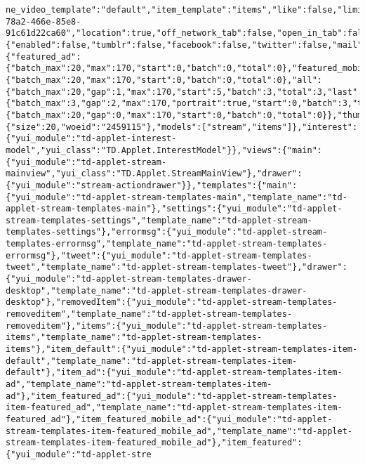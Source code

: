 \begin{verbatim}
ne_video_template":"default","item_template":"items","like":false,"limit_height":true,"link_to_finance":false,"listId_mixin_enabled":false,"listId_mixin_start":9,"listId_mixin_interval":10,"listId_mixin_count":17,"listId_mixin_freshness_window":48,"listId_mixin_id":"a8b3e8e1-78a2-466e-85e8-91c61d22ca60","location":true,"off_network_tab":false,"open_in_tab":false,"pcsExclusions":false,"previewUrl_enabled":false,"pubtime_format":"ONE_UNIT_ABBREVIATED","pubtime_maxage":3600,"search_tags":false,"sfl":true,"sfl_get_started_string":"SFL_LINK","sfl_get_started_title":"SFL_TITLE_ONE","scrollbuffer":900,"show_lastvist":true,"social_sharing":{"enabled":false,"tumblr":false,"facebook":false,"twitter":false,"mail":false},"stream_actions":true,"summary":true,"templates":{"featured_ad":{"batch_max":20,"max":170,"start":0,"batch":0,"total":0},"featured_mobile_ad":{"batch_max":20,"max":170,"start":0,"batch":0,"total":0},"all":{"batch_max":20,"gap":1,"max":170,"start":5,"batch":3,"total":3,"last":13},"featured":{"batch_max":3,"gap":2,"max":170,"portrait":true,"start":0,"batch":3,"total":3,"last":13},"inline_video":{"batch_max":20,"gap":0,"max":170,"start":0,"batch":0,"total":0}},"thumbnail":true,"thumbnail_align":"left","thumbnail_hover":true,"thumbnail_fix_width":false,"thumbnail_size":82,"tweet_action":true,"video_autoplay":false,"viewer":false,"viewer_include_all":false,"viewer_off_network":true,"viewer_prefetch_lcp":false,"viewer_preview_card":true,"disable_medium":false},"header_enabled":true,"slim_heading":false,"pageload_image_count":3,"allow_empty_response":0,"xcc":"se"},"settings":{"size":20,"woeid":"2459115"},"models":["stream","items"]},"interest":{"yui_module":"td-applet-interest-model","yui_class":"TD.Applet.InterestModel"}},"views":{"main":{"yui_module":"td-applet-stream-mainview","yui_class":"TD.Applet.StreamMainView"},"drawer":{"yui_module":"stream-actiondrawer"}},"templates":{"main":{"yui_module":"td-applet-stream-templates-main","template_name":"td-applet-stream-templates-main"},"settings":{"yui_module":"td-applet-stream-templates-settings","template_name":"td-applet-stream-templates-settings"},"errormsg":{"yui_module":"td-applet-stream-templates-errormsg","template_name":"td-applet-stream-templates-errormsg"},"tweet":{"yui_module":"td-applet-stream-templates-tweet","template_name":"td-applet-stream-templates-tweet"},"drawer":{"yui_module":"td-applet-stream-templates-drawer-desktop","template_name":"td-applet-stream-templates-drawer-desktop"},"removedItem":{"yui_module":"td-applet-stream-templates-removeditem","template_name":"td-applet-stream-templates-removeditem"},"items":{"yui_module":"td-applet-stream-templates-items","template_name":"td-applet-stream-templates-items"},"item_default":{"yui_module":"td-applet-stream-templates-item-default","template_name":"td-applet-stream-templates-item-default"},"item_ad":{"yui_module":"td-applet-stream-templates-item-ad","template_name":"td-applet-stream-templates-item-ad"},"item_featured_ad":{"yui_module":"td-applet-stream-templates-item-featured_ad","template_name":"td-applet-stream-templates-item-featured_ad"},"item_featured_mobile_ad":{"yui_module":"td-applet-stream-templates-item-featured_mobile_ad","template_name":"td-applet-stream-templates-item-featured_mobile_ad"},"item_featured":{"yui_module":"td-applet-stre
\end{verbatim}
